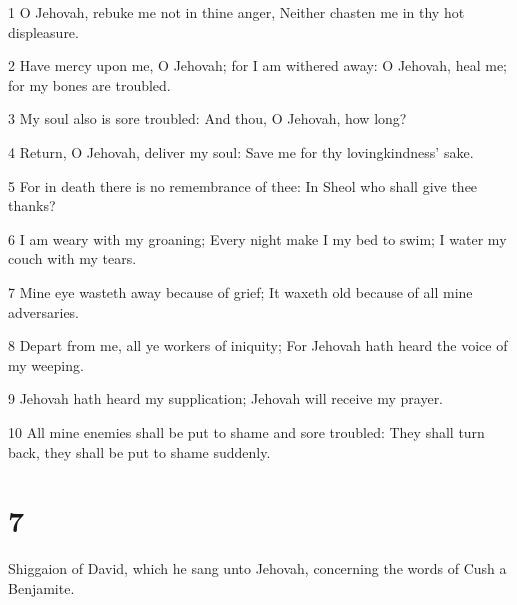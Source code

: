 \par 1 O Jehovah, rebuke me not in thine anger, Neither chasten me in thy hot displeasure.
\par 2 Have mercy upon me, O Jehovah; for I am withered away: O Jehovah, heal me; for my bones are troubled.
\par 3 My soul also is sore troubled: And thou, O Jehovah, how long?
\par 4 Return, O Jehovah, deliver my soul: Save me for thy lovingkindness' sake.
\par 5 For in death there is no remembrance of thee: In Sheol who shall give thee thanks?
\par 6 I am weary with my groaning; Every night make I my bed to swim; I water my couch with my tears.
\par 7 Mine eye wasteth away because of grief; It waxeth old because of all mine adversaries.
\par 8 Depart from me, all ye workers of iniquity; For Jehovah hath heard the voice of my weeping.
\par 9 Jehovah hath heard my supplication; Jehovah will receive my prayer.
\par 10 All mine enemies shall be put to shame and sore troubled: They shall turn back, they shall be put to shame suddenly.

\chapter{7}

\par Shiggaion of David, which he sang unto Jehovah, concerning the words of Cush a Benjamite.

